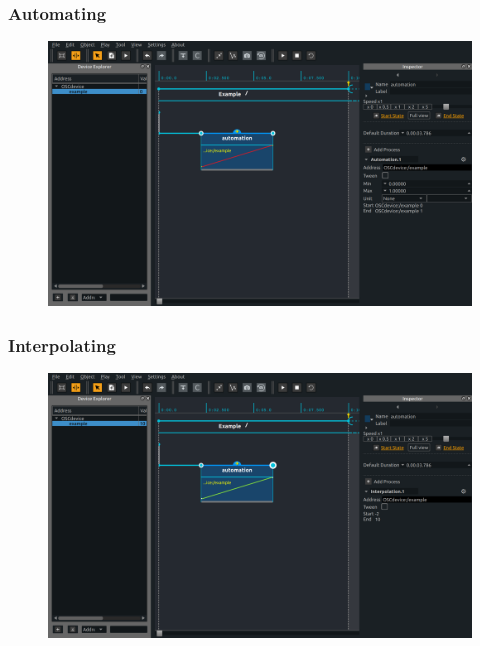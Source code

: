 \documentclass[handout]{beamer}
\begin{document}
\begin{frame}
\frametitle{Automating}
\Large
\begin{figure}
    \includegraphics[width=\textwidth]{images/autom.png}
\end{figure}
\end{frame}

\begin{frame}
\frametitle{Interpolating}
\Large
\begin{figure}
    \includegraphics[width=\textwidth]{images/interp.png}
\end{figure}
\end{frame}
\end{document}
